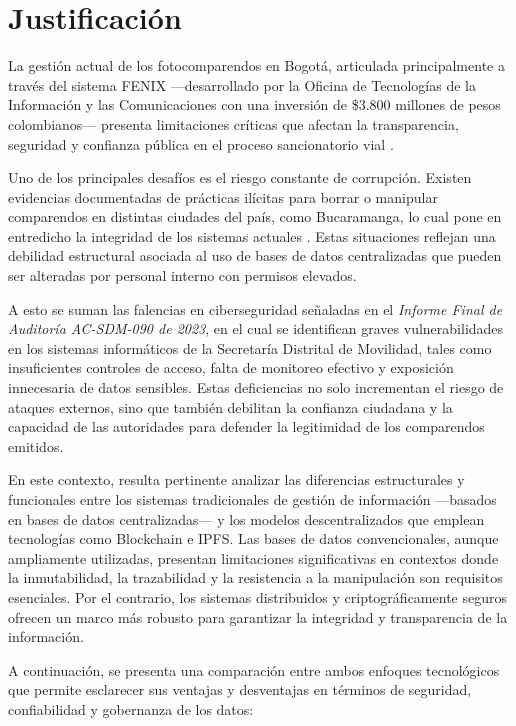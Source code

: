 \section{\large Justificación}

La gestión actual de los fotocomparendos en Bogotá, articulada principalmente a través del sistema FENIX —desarrollado por la Oficina de Tecnologías de la Información y las Comunicaciones con una inversión de \$3.800 millones de pesos colombianos— presenta limitaciones críticas que afectan la transparencia, seguridad y confianza pública en el proceso sancionatorio vial \parencite{resolucionFenix}.

Uno de los principales desafíos es el riesgo constante de corrupción. Existen evidencias documentadas de prácticas ilícitas para borrar o manipular comparendos en distintas ciudades del país, como Bucaramanga, lo cual pone en entredicho la integridad de los sistemas actuales \parencite{blogAletta,procuraduriaBucaramanga}. Estas situaciones reflejan una debilidad estructural asociada al uso de bases de datos centralizadas que pueden ser alteradas por personal interno con permisos elevados.

A esto se suman las falencias en ciberseguridad señaladas en el \textit{Informe Final de Auditoría AC-SDM-090 de 2023}, en el cual se identifican graves vulnerabilidades en los sistemas informáticos de la Secretaría Distrital de Movilidad, tales como insuficientes controles de acceso, falta de monitoreo efectivo y exposición innecesaria de datos sensibles\parencite{auditoriaSDM}. Estas deficiencias no solo incrementan el riesgo de ataques externos, sino que también debilitan la confianza ciudadana y la capacidad de las autoridades para defender la legitimidad de los comparendos emitidos.

En este contexto, resulta pertinente analizar las diferencias estructurales y funcionales entre los sistemas tradicionales de gestión de información —basados en bases de datos centralizadas— y los modelos descentralizados que emplean tecnologías como Blockchain e IPFS. Las bases de datos convencionales, aunque ampliamente utilizadas, presentan limitaciones significativas en contextos donde la inmutabilidad, la trazabilidad y la resistencia a la manipulación son requisitos esenciales. Por el contrario, los sistemas distribuidos y criptográficamente seguros ofrecen un marco más robusto para garantizar la integridad y transparencia de la información.

A continuación, se presenta una comparación entre ambos enfoques tecnológicos que permite esclarecer sus ventajas y desventajas en términos de seguridad, confiabilidad y gobernanza de los datos:

